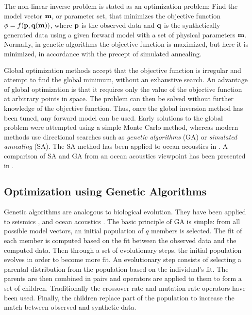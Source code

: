 \documentclass{saclantc}
\begin{document}
The non-linear inverse problem is stated as an optimization problem:
Find the model vector $\bf m$, or parameter set, that minimizes the
objective function $\phi= f( {\bf p}, {\bf q}( {\bf m}) )$, where
$\bf p$ is the observed data and $\bf q$ is the synthetically
generated data using a given forward model with a set of physical
parameters $\bf m $.
Normally, in genetic algorithms the objective function is
maximized, but here it is  minimized, 
in accordance with the precept of simulated annealing.  
    
Global optimization methods accept that the objective function is
irregular and attempt to find the global minimum, without an
exhaustive search. An advantage of global optimization is that it
requires only the value of the objective function at arbitrary points in
space. The problem can then be solved without further knowledge of
the objective function.  Thus, once the global inversion method has been
tuned, any forward model can be used.
Early solutions to the global problem were attempted using a simple
Monte Carlo method, whereas modern methods use directional searches
such as {\it genetic algorithms} (GA) or {\it simulated annealing}
(SA).
The SA method has been applied to ocean acoustics in 
\cite{collins:asa92,collins:asa91,lindsay:ieee93,dosso:ieee93}.
A comparison of SA and GA from an ocean acoustics viewpoint has been
presented in \cite{gerstoft:ecua98}.

\subsection{Optimization using Genetic Algorithms}
\noindent

Genetic algorithms are  analogous  to biological evolution.
They have been applied to  seismics
\cite{scales:jcp92,sambrigde:gji92,stoffa:g91,sen:gji92}, and
 ocean acoustics \cite{gerstoft:asa94,jesus:jca96,eliza:ecua3,lotsberg:ecua3,rendas:icassp97}.
The basic principle of  GA is simple: from all possible model
vectors, an initial population of $q $ members is selected. The
fit of each member is computed based on the fit between the
observed data and the computed data.  Then through a set of
evolutionary steps, the initial population evolves in order to become
more fit. An evolutionary step consists of selecting a parental
distribution from the population based on the individual's
fit. The parents are then combined in pairs and operators are
applied to them to form a set of children. Traditionally the crossover
rate and mutation rate operators have been used.  Finally, the
children replace part of the population to increase the match between
observed and synthetic data.
\end{document}
